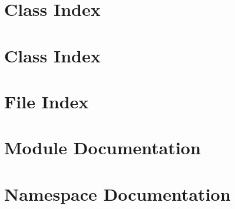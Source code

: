 \documentclass{book}
\begin{document}
\chapter{Class Index}

\chapter{Class Index}

\chapter{File Index}

\chapter{Module Documentation}





\chapter{Namespace Documentation}




























\end{document}
